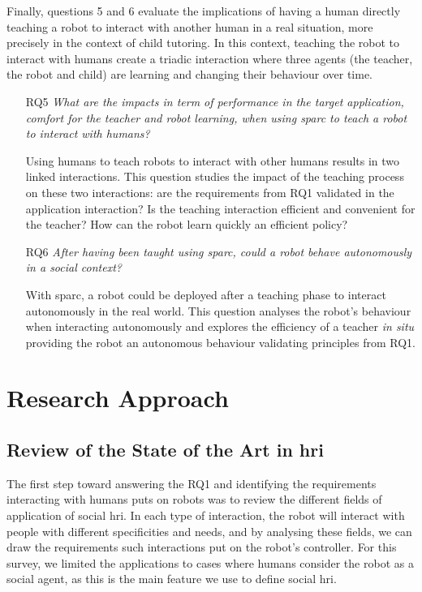 Finally, questions 5 and 6 evaluate the implications of having a human directly teaching a robot to interact with another human in a real situation, more precisely in the context of child tutoring. In this context, teaching the robot to interact with humans create a triadic interaction where three agents (the teacher, the robot and child) are learning and changing their behaviour over time.

\begin{itemize}
	\item [RQ5] \emph{What are the impacts in term of performance in the target application, comfort for the teacher and robot learning, when using \gls{sparc} to teach a robot to interact with humans?}

		Using humans to teach robots to interact with other humans results in two linked interactions. This question studies the impact of the teaching process on these two interactions: are the requirements from RQ1 validated in the application interaction? Is the teaching interaction efficient and convenient for the teacher? How can the robot learn quickly an efficient policy?
		
    \item [RQ6] \emph{After having been taught using \gls{sparc}, could a robot behave autonomously in a social context?}

	 	With \gls{sparc}, a robot could be deployed after a teaching phase to interact autonomously in the real world. This question analyses the robot's behaviour when interacting autonomously and explores the efficiency of a teacher \textit{in situ} providing the robot an autonomous behaviour validating principles from RQ1.
	 
\end{itemize}

\section{Research Approach}

\subsection{Review of the State of the Art in \gls{hri}}

The first step toward answering the RQ1 and identifying the requirements interacting with humans puts on robots was to review the different fields of application of social \gls{hri}. In each type of interaction, the robot will interact with people with different specificities and needs, and by analysing these fields, we can draw the requirements such interactions put on the robot's controller. For this survey, we limited the applications to cases where humans consider the robot as a social agent, as this is the main feature we use to define social \gls{hri}.

